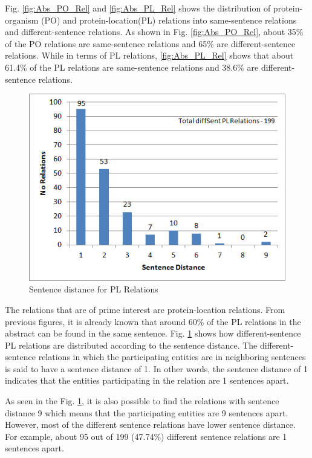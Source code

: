 Fig. \ref{fig:Abs_PO_Rel} and \ref{fig:Abs_PL_Rel} shows the distribution of protein-organism (PO) and protein-location(PL) relations into same-sentence relations and different-sentence relations. As shown in Fig. \ref{fig:Abs_PO_Rel}, about 35\% of the PO relations are same-sentence relations and 65\% are different-sentence relations. While in terms of PL relations, \ref{fig:Abs_PL_Rel} shows that about 61.4\% of the PL relations are same-sentence relations and 38.6\% are different-sentence relations.

\begin{figure}
\centering
\includegraphics[scale=0.9]{figures/SentenceDistance_PLRel.png}
\caption{Sentence distance for PL Relations}\label{fig:SentDistancePL}
\end{figure}

The relations that are of prime interest are protein-location relations. From previous figures, it is already known that around 60\% of the PL relations in the abstract can be found in the same sentence. Fig. \ref{fig:SentDistancePL} shows how different-sentence PL relations are distributed according to the sentence distance. The different-sentence relations in which the participating entities are in neighboring sentences is said to have a sentence distance of 1. In other words, the sentence distance of 1 indicates that the entities participating in the relation are 1 sentences apart. 

As seen in the Fig. \ref{fig:SentDistancePL}, it is also possible to find the relations with sentence distance 9 which means that the participating entities are 9 sentences apart. However, most of the different sentence relations have lower sentence distance. For example, about 95 out of 199 (47.74\%) different sentence relations are 1 sentences apart.

